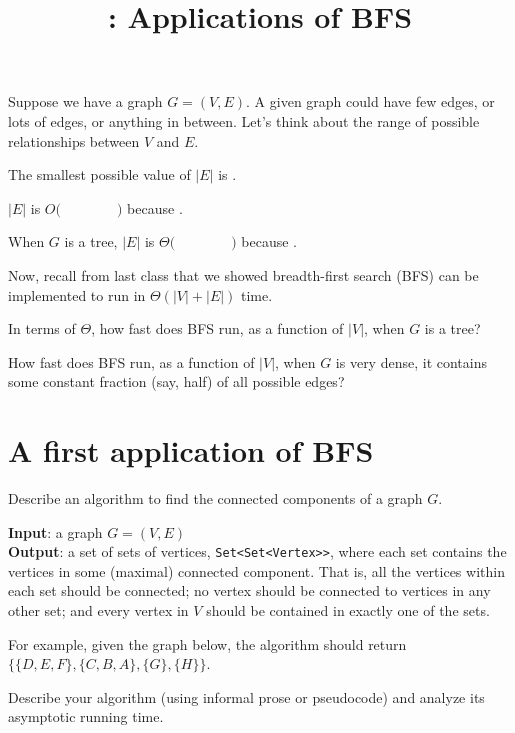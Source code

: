 \documentclass{tufte-handout}
\title{\thecourse: Applications of BFS}
\date{}
\begin{document}
\maketitle

Suppose we have a graph $G = (V,E)$.  A given graph could have few
edges, or lots of edges, or anything in between.  Let's think about
the range of possible relationships between $V$ and $E$.

\begin{questions}
\item The smallest possible value of $|E|$ is \blank.
\item $|E|$ is $O\Big( \qquad\qquad \Big)$ because \blank.
\item When $G$ is a tree, $|E|$ is $\Theta\Big( \qquad\qquad \Big)$
  because \blank.
\end{questions}

Now, recall from last class that we showed breadth-first search (BFS) can
be implemented to run in $\Theta(|V| + |E|)$ time.

\begin{questions}
\item In terms of $\Theta$, how fast does BFS run, as a function of
  $|V|$, when $G$ is a tree?
\item How fast does BFS run, as a function of $|V|$, when $G$ is very
  dense, \ie it contains some constant fraction (say, half) of all
  possible edges?
\end{questions}

\newpage
\section{A first application of BFS}

\begin{questions}
  \item Describe an algorithm to find the connected components of a
    graph $G$.

    \textbf{Input}: a graph $G = (V,E)$ \\
    \textbf{Output}: a set of sets of vertices,
    \texttt{Set<Set<Vertex{>}>}, where each set contains the vertices in
    some (maximal) connected component.  That is, all the vertices
    within each set should be connected; no vertex should be
    connected to vertices in any other set; and every vertex in $V$
    should be contained in exactly one of the sets.

    For example, given the graph below, the algorithm should return
    $\{\{D,E,F\}, \{C,B,A\}, \{G\}, \{H\}\}$.

    \begin{center}
      
    \end{center}

    Describe your algorithm (using informal prose or pseudocode) and
    analyze its asymptotic running time.
\end{questions}
\end{document}
